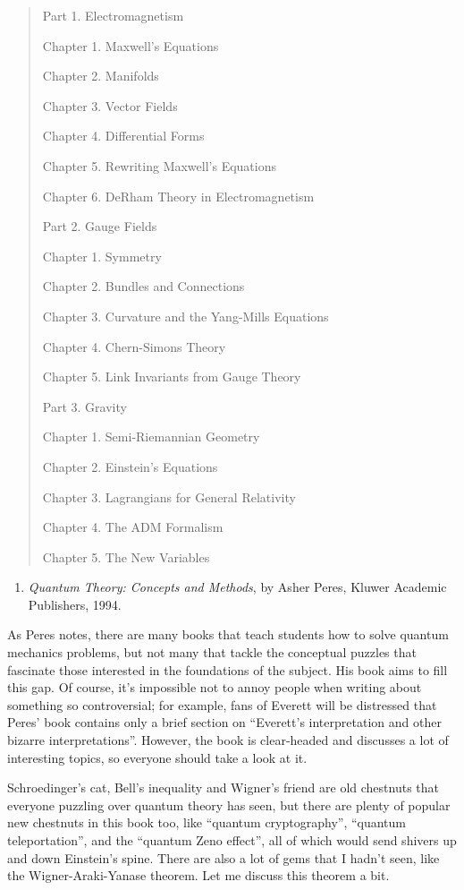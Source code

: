 \documentclass{article}
\def\tightlist{}
\begin{document}
\begin{quote}
Part 1. Electromagnetism

Chapter 1. Maxwell's Equations

Chapter 2. Manifolds

Chapter 3. Vector Fields

Chapter 4. Differential Forms

Chapter 5. Rewriting Maxwell's Equations

Chapter 6. DeRham Theory in Electromagnetism

Part 2. Gauge Fields

Chapter 1. Symmetry

Chapter 2. Bundles and Connections

Chapter 3. Curvature and the Yang-Mills Equations

Chapter 4. Chern-Simons Theory

Chapter 5. Link Invariants from Gauge Theory

Part 3. Gravity

Chapter 1. Semi-Riemannian Geometry

Chapter 2. Einstein's Equations

Chapter 3. Lagrangians for General Relativity

Chapter 4. The ADM Formalism

Chapter 5. The New Variables
\end{quote}

\begin{enumerate}
\def\labelenumi{\arabic{enumi})}
\setcounter{enumi}{1}
\tightlist
\item
  \emph{Quantum Theory: Concepts and Methods}, by Asher Peres, Kluwer
  Academic Publishers, 1994.
\end{enumerate}

As Peres notes, there are many books that teach students how to solve
quantum mechanics problems, but not many that tackle the conceptual
puzzles that fascinate those interested in the foundations of the
subject. His book aims to fill this gap. Of course, it's impossible not
to annoy people when writing about something so controversial; for
example, fans of Everett will be distressed that Peres' book contains
only a brief section on ``Everett's interpretation and other bizarre
interpretations''. However, the book is clear-headed and discusses a lot
of interesting topics, so everyone should take a look at it.

Schroedinger's cat, Bell's inequality and Wigner's friend are old
chestnuts that everyone puzzling over quantum theory has seen, but there
are plenty of popular new chestnuts in this book too, like ``quantum
cryptography'', ``quantum teleportation'', and the ``quantum Zeno
effect'', all of which would send shivers up and down Einstein's spine.
There are also a lot of gems that I hadn't seen, like the
Wigner-Araki-Yanase theorem. Let me discuss this theorem a bit.
\end{document}
